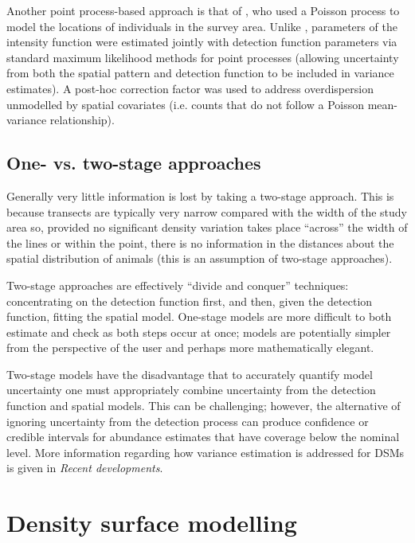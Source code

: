 \documentclass[a4paper,12pt]{article}
\begin{document}
Another point process-based approach is that of \cite{Johnson:2010gf}, who used a Poisson process to model the locations of individuals in the survey area. Unlike \cite{Niemi:2010kx}, parameters of the intensity function were estimated jointly with detection function parameters via standard maximum likelihood methods for point processes \citep{Baddeley:2000to} (allowing uncertainty from both the spatial pattern and detection function to be included in variance estimates). A post-hoc correction factor was used to address overdispersion unmodelled by spatial covariates (i.e. counts that do not follow a Poisson mean-variance relationship).

\subsection*{One- vs. two-stage approaches}

Generally very little information is lost by taking a two-stage approach. This is because transects are typically very narrow compared with the width of the study area so, provided no significant density variation takes place ``across'' the width of the lines or within the point, there is no information in the distances about the spatial distribution of animals (this is an assumption of two-stage approaches). 

Two-stage approaches are effectively ``divide and conquer'' techniques: concentrating on the detection function first, and then, given the detection function, fitting the spatial model. One-stage models are more difficult to both estimate and check as both steps occur at once; models are potentially simpler from the perspective of the user and perhaps more mathematically elegant.

 Two-stage models have the disadvantage that to accurately quantify model uncertainty one must appropriately combine uncertainty from the detection function and spatial models. This can be challenging; however, the alternative of ignoring uncertainty from the detection process \cite[e.g.][]{Niemi:2010kx} can produce confidence or credible intervals for abundance estimates that have coverage below the nominal level. More information regarding how variance estimation is addressed for DSMs is given in \textit{Recent developments}.

\section*{Density surface modelling}
\label{s:dsm}
\end{document}
